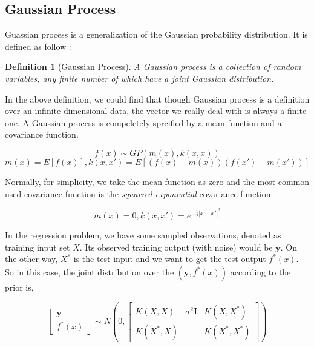 \documentclass[11pt,twoside,a4paper]{article}
\newtheorem{mydef}{Definition}
\begin{document}
\subsection{Gaussian Process}
Guassian process is a generalization of the Gaussian probability
distribution. It is defined as follow \cite{Rasmussen2006}:
\begin{mydef}[Gaussian Process]
A Gaussian process is \textit{a collection of random variables, any finite
number of which have a joint Gaussian distribution}.
\end{mydef}

In the above definition, we could find that though Gaussian process is
a definition over an infinite dimensional data, the vector we really
deal with is always a finite one. A Gaussian process is compeletely
sprcified by a mean function and a covariance function. 
\begin{center}
\begin{equation}
f(x) \sim GP(m(x), k(x, x))
\end{equation}
\begin{equation}
m(x) = E[f(x)], k(x, x') = E[(f(x)-m(x))(f(x')-m(x'))]
\end{equation}
\end{center}
Normally, for simplicity, we take the mean function as zero and the
most common used covariance function is the \textit{squarred
  exponential} covariance function.
\begin{center}
\begin{equation}
m(x) = 0, k(x, x') = e^{-\frac{1}{2}|x-x'|^2}
\end{equation}
\end{center}
In the regression problem, we have some sampled observations, denoted
as training input set $X$. Its observed training output (with noise) would be $\textbf{y}$. On the other
way, $X^*$ is the test input and we want to get the test output
$f^*(x)$. So in this case, the joint distribution over the
$(\textbf{y}, f^*(x))$ according to the prior is,
\begin{center}
\begin{equation}
\begin{bmatrix}
\textbf{y} \\
f^*(x)
\end{bmatrix} \sim N (0,
\begin{bmatrix}
K(X, X) + \sigma^2\textbf{I} & K(X, X^*) \\
K(X^*, X) & K(X^*, X^*)
\end{bmatrix} )
\end{equation}
\end{center}
\end{document}
